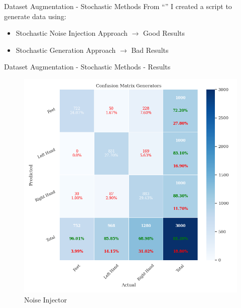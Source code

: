 \begin{frame}{Dataset Augmentation - Stochastic Methods}
    From ``'' I created a script to generate data using:
    \begin{itemize}
        \item Stochastic Noise Injection Approach $\rightarrow{}$ Good Results
        \item Stochastic Generation Approach $\rightarrow{}$ Bad Results
    \end{itemize}
\end{frame}
\begin{frame}{Dataset Augmentation - Stochastic Methods - Results}
    \begin{minipage}{0.49\textwidth}
        \begin{figure}[htpb!]
            \centering
            \includegraphics[width=\textwidth]{figures/augmentation/stochastic/confusion_matrix_generators_2024_03_30_18_00_20_noise_injector_using_LSTMNet_0.5943600867678959.pkl.png}
            \caption{Noise Injector}
        \end{figure}
    \end{minipage}
    \begin{minipage}{0.49\textwidth}
        \begin{figure}[htpb!]
            \centering

\end{figure}
\end{minipage}
\end{frame}
